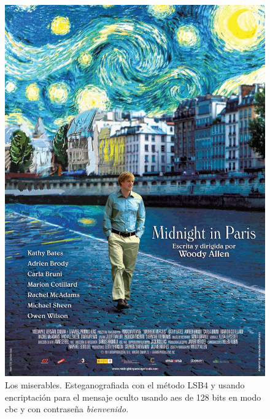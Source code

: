 \documentclass[a4paper,10pt]{article}
\begin{document}
\begin{figure}[!htb]
%
  \includegraphics[scale=0.175]{./images/medianocheparis1.png}
  \caption{Los miserables. Esteganografiada con el método LSB4 y usando encriptación para el mensaje oculto usando aes de 128 bits en
    modo cbc y con contraseña \textit{bienvenido}.}\label{fig:awesome_image7}
\endminipage
{}%


\end{figure}
\end{document}
